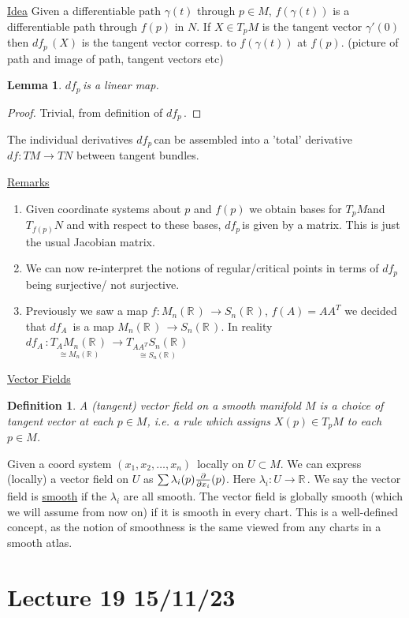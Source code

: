 \documentclass[12pt,a4paper]{article}
\newcommand{\rR}{\ensuremath{\mathbb{R}\,}}
\newcommand{\xonen}{\ensuremath{(x_1,x_2,\ldots, x_n)\,}}
\newcommand{\tpm}{\ensuremath{T_p M}}
\newcommand{\tm}{\ensuremath{T M}}
\newcommand{\tn}[1]{\ensuremath{T {#1}}}
\newcommand{\tqn}[2]{\ensuremath{T_{#1} {#2}}}
\newcommand{\dfp}{\ensuremath{df_p \,}}
\newcommand{\dfq}[1]{\ensuremath{df_{#1}\,}}
\newcommand{\df}{\ensuremath{df}}
\newcommand{\mnr}{\ensuremath{M_n(\rR)\,}}
\newcommand{\ul}[1]{\underline{#1}}
\newtheorem{defn}[thm]{Definition}
\newtheorem{lemma}[thm]{Lemma}
\begin{document}
\ul{Idea} Given a differentiable path $\gamma(t)$ through $p\in M$, $f(\gamma(t))$ is a differentiable path through $f(p)$ in $N$. If $X\in\tpm$ is the tangent vector $\gamma'(0)$ then $\dfp(X)$ is the tangent vector corresp. to $f(\gamma(t))$ at $f(p)$. (picture of path and image of path, tangent vectors etc)

\begin{lemma}
\dfp is a linear map.
\end{lemma} 
\begin{proof}
Trivial, from definition of \dfp.
\end{proof}

The individual derivatives \dfp can be assembled into a 'total' derivative $\df:\tm\to\tn{N}$ between tangent bundles.

\ul{Remarks}
\begin{enumerate}
\item Given coordinate systems about $p$ and $f(p)$ we obtain bases for \tpm and \tqn{f(p)}{N} and with respect to these bases, \dfp is given by a matrix. This is just the usual Jacobian matrix.
\item We can now re-interpret the notions of regular/critical points in terms of \dfp being surjective/ not surjective.
\item Previously we saw a map $f:\mnr \to S_n(\rR)$, $f(A)=AA^T$ we decided that \dfq{A} is a map $\mnr \to S_n(\rR)$. In reality $\dfq{A}:\underset{\cong\mnr}{\tqn{A}{\mnr}}\to \underset{\cong S_n(\rR)}{\tqn{AA^T}{S_n(\rR)}}$
\end{enumerate}

\ul{Vector Fields}
\begin{defn}
A (tangent) vector field on a smooth manifold $M$ is a choice of tangent vector at each $p\in M$, i.e. a rule which assigns $X(p)\in\tpm$ to each $p\in M$.
\end{defn}

Given a coord system $\xonen$ locally on $U\subset M$. We can express (locally) a vector field on $U$ as $\sum \lambda_i(p)\pdv{x_i}(p)$. Here $\lambda_i:U\to \rR$. We say the vector field is \ul{smooth} if the $\lambda_i$ are all smooth. The vector field is globally smooth (which we will assume from now on) if it is smooth in every chart. This is a well-defined concept, as the notion of smoothness is the same viewed from any charts in a smooth atlas.

\section{Lecture 19 15/11/23}
\end{document}

